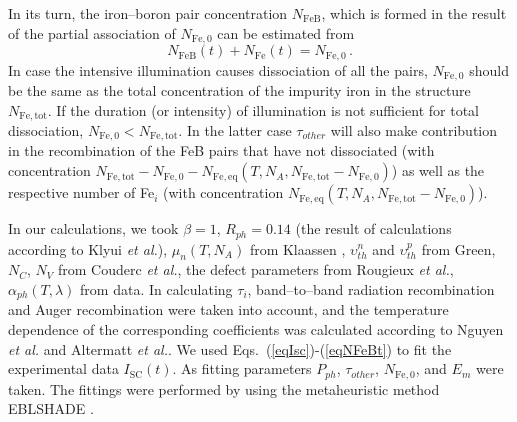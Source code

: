 \documentclass[%
 aip,jap,
 amsmath,amssymb,
 reprint,%
]{revtex4-1}
\begin{document}
In its turn, the iron--boron pair concentration $N_\mathrm{FeB}$, which is formed in the result of the partial association of $N_\mathrm{Fe,0}$ can be estimated from
\begin{equation}
\label{eqNFeBt}
N_\mathrm{FeB}(t)+N_\mathrm{Fe}(t)=N_\mathrm{Fe,0}\,.
\end{equation}
In case the intensive illumination causes dissociation of all the pairs,
$N_\mathrm{Fe,0}$ should be the same as the total concentration of the impurity iron in the structure $N_\mathrm{Fe,tot}$.
If the duration (or intensity) of illumination is not sufficient for total dissociation,
$N_\mathrm{Fe,0}< N_\mathrm{Fe,tot}$.
In the latter case $\tau_{other}$ will also make contribution in the
recombination of the FeB pairs that have not dissociated
(with concentration $N_\mathrm{Fe,tot}-N_\mathrm{Fe,0}-N_\mathrm{Fe,eq}(T, N_A, N_\mathrm{Fe,tot}-N_\mathrm{Fe,0})$)
as well as the respective number of Fe$_i$
(with concentration $N_\mathrm{Fe,eq}(T, N_A, N_\mathrm{Fe,tot}-N_\mathrm{Fe,0})$).

In our calculations,
we took $\beta=1$,
$R_{ph}=0.14$ (the result of calculations  according to Klyui \emph{et al.}\cite{KostRefl2000}),
$\mu_n(T, N_A)$ from Klaassen \cite{KLAASSEN953},
$\upsilon_{th}^n$ and $\upsilon_{th}^p$ from Green\cite{Nc:Green},
$N_C$, $N_V$ from Couderc \emph{et al.}\cite{Si_ni_Couderc},
the defect parameters from Rougieux \emph{et al.}\cite{ROUGIEUX2018},
$\alpha_{ph} (T,\lambda)$ from data\cite{Si:Absorb,GreenOptic}.
In calculating $\tau_i$, band--to--band radiation recombination and Auger recombination were taken into account,
and the temperature dependence of the corresponding coefficients
was calculated according to Nguyen \emph{et al.}\cite{Si_BtB} and Altermatt \emph{et al.}\cite{Si_Auger}.
We used Eqs.~(\ref{eqIsc})-(\ref{eqNFeBt}) to fit the experimental data $I_\mathrm{SC}(t)$.
As fitting parameters  $P_{ph}$, $\tau_{other}$, $N_\mathrm{Fe,0}$, and $E_m$  were taken.
The fittings were performed by using the metaheuristic method EBLSHADE \cite{EBLSHADE}.
\end{document}
